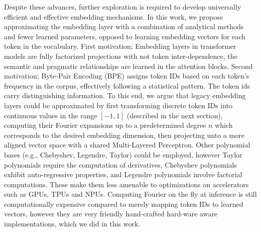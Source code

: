 \documentclass{article}
\begin{document}
Despite these advances, further exploration is required to develop universally efficient and effective embedding mechanisms. In this work, we propose approximating the embedding layer with a combination of analytical methods and fewer learned parameters, opposed to learning embedding vectors for each token in the vocabulary. First motivation; Embedding layers in transformer models are fully factorized projections with not token inter-dependence, the semantic and pragmatic relationships are learned in the attention blocks. Second motivation; Byte-Pair Encoding (BPE) assigns token IDs based on each token's frequency in the corpus, effectively following a statistical pattern. The token ids carry distinguishing information. To this end, we argue that legacy embedding layers could be approximated by first transforming discrete token IDs into continuous values in the range \([-1, 1]\) (described in the next section), computing their Fourier expansions up to a predetermined degree \(n\) which corresponds to the desired embedding dimension, then projecting unto a more aligned vector space with a shared Multi-Layered Perceptron. Other polynomial bases (e.g., Chebyshev, Legendre, Taylor) could be employed, however Taylor polynomials require the computation of derivatives, Chebyshev polynomials exhibit auto-regressive properties, and Legendre polynomials involve factorial computations. These make them less amenable to optimizations on accelerators such as GPUs, TPUs and NPUs. Computing Fourier on the fly at inference is still computationally expensive compared to merely mapping token IDs to learned vectors, however they are very friendly hand-crafted hard-ware aware implementations, which we did in this work. 
\end{document}
